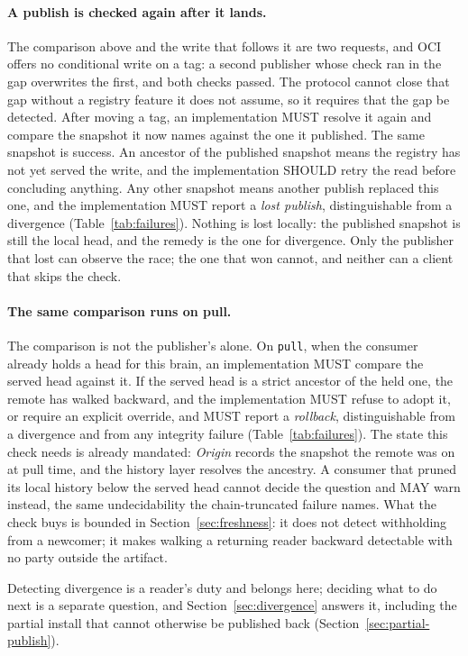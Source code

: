 \documentclass[11pt,a4paper]{article}
\begin{document}
\paragraph{A publish is checked again after it lands.}
The comparison above and the write that follows it are two requests, and OCI
offers no conditional write on a tag: a second publisher whose check ran in
the gap overwrites the first, and both checks passed. The protocol cannot close
that gap without a registry feature it does not assume, so it requires that the
gap be detected. After moving a tag, an implementation MUST resolve it again
and compare the snapshot it now names against the one it published. The same
snapshot is success. An ancestor of the published snapshot means the registry
has not yet served the write, and the implementation SHOULD retry the read
before concluding anything. Any other snapshot means another publish replaced
this one, and the implementation MUST report a \emph{lost publish},
distinguishable from a divergence (Table~\ref{tab:failures}). Nothing is lost
locally: the published snapshot is still the local head, and the remedy is the
one for divergence. Only the publisher that lost can observe the race; the one
that won cannot, and neither can a client that skips the check.

\paragraph{The same comparison runs on pull.}
The comparison is not the publisher's alone. On \texttt{pull}, when the
consumer already holds a head for this brain, an implementation MUST compare
the served head against it. If the served head is a strict ancestor of the
held one, the remote has walked backward, and the implementation MUST refuse
to adopt it, or require an explicit override, and MUST report a
\emph{rollback}, distinguishable from a divergence and from any integrity
failure (Table~\ref{tab:failures}). The state this check needs is already
mandated: \emph{Origin} records the snapshot the remote was on at pull time,
and the history layer resolves the ancestry. A consumer that pruned its local
history below the served head cannot decide the question and MAY warn
instead, the same undecidability the chain-truncated failure names. What the
check buys is bounded in Section~\ref{sec:freshness}: it does not detect
withholding from a newcomer; it makes walking a returning reader backward
detectable with no party outside the artifact.

Detecting divergence is a reader's duty and belongs here; deciding what to do
next is a separate question, and Section~\ref{sec:divergence} answers it,
including the partial install that cannot otherwise be published back
(Section~\ref{sec:partial-publish}).
\end{document}
